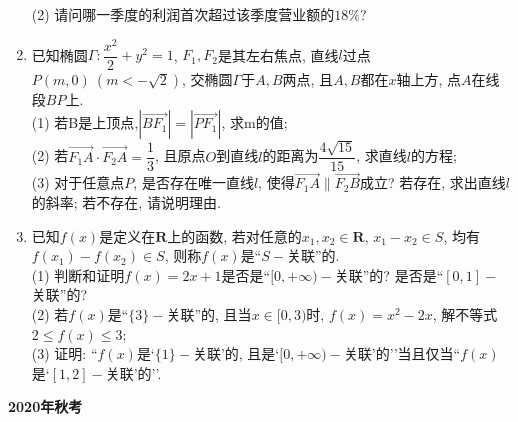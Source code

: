 \documentclass[10pt,a4paper]{article}
\begin{document}
\begin{enumerate}[1.]
(2) 请问哪一季度的利润首次超过该季度营业额的$18\%$?
\item 已知椭圆$\Gamma:\dfrac{x^2}2+y^2=1$, $F_1, F_2$是其左右焦点, 直线$l$过点$P(m,0) \ (m<-\sqrt2)$, 交椭圆$\Gamma$于$A,B$两点, 且$A,B$都在$x$轴上方, 点$A$在线段$BP$上.\\
(1) 若B是上顶点,$|\overrightarrow{BF_1}|=|\overrightarrow{PF_1}|$, 求m的值;\\
(2) 若$\overrightarrow{F_1A}\cdot \overrightarrow{F_2A}=\dfrac13$, 且原点$O$到直线$l$的距离为$\dfrac{4\sqrt{15}}{15}$, 求直线$l$的方程;\\
(3) 对于任意点$P$, 是否存在唯一直线$l$, 使得$\overrightarrow{F_1A}\parallel \overrightarrow{F_2B}$成立? 若存在, 求出直线$l$的斜率; 若不存在, 请说明理由.
\item 已知$f(x)$是定义在$\mathbf{R}$上的函数, 若对任意的$x_1,x_2\in \mathbf{R}$, $x_1-x_2\in S$, 均有$f(x_1)-f(x_2)\in S$, 则称$f(x)$是``$S-$关联''的.\\
(1) 判断和证明$f(x)=2x+1$是否是``$[0,+\infty)-$关联''的? 是否是``$[0,1]-$关联''的?\\
(2) 若$f(x)$是``$\{3\}-$关联''的, 且当$x\in [0,3)$时, $f(x)=x^2-2x$, 解不等式$2 \le f(x)\le 3$;\\
(3) 证明: ``$f(x)$是`$\{1\}-$关联'的, 且是`$[0,+\infty)-$关联'的''当且仅当``$f(x)$是`$[1,2]-$关联'的''.







\end{enumerate}

\newpage

{\bf 2020年秋考}
\end{document}
